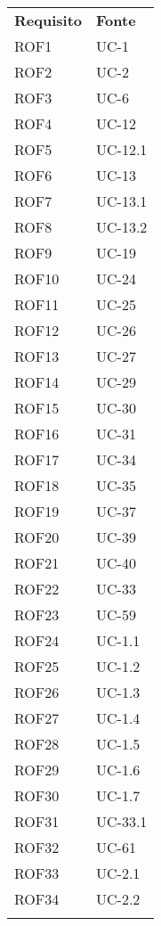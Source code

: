 \begin{longtable}{| p{5cm} | p{5cm} |}
		\rowcolor{LightBlue}
		\color{white}\bfseries Requisito & \color{white}\bfseries Fonte \\[0.25cm]
		\rowcolor{LightGray}
		ROF1 & UC-1\\
		ROF2 & UC-2\\
		\rowcolor{LightGray}
		ROF3 & UC-6\\
		ROF4 & UC-12\\
		\rowcolor{LightGray}
		ROF5 & UC-12.1\\
		ROF6 & UC-13\\
		\rowcolor{LightGray}
		ROF7 & UC-13.1\\
		ROF8 & UC-13.2\\
		\rowcolor{LightGray}
		ROF9 & UC-19\\
		ROF10 & UC-24\\
		\rowcolor{LightGray}
		ROF11 & UC-25\\
		ROF12 & UC-26\\
		\rowcolor{LightGray}
		ROF13 & UC-27\\
		ROF14 & UC-29\\
		\rowcolor{LightGray}
		ROF15 & UC-30\\
		ROF16 & UC-31\\
		\rowcolor{LightGray}
		ROF17 & UC-34\\
		ROF18 & UC-35\\
		\rowcolor{LightGray}
		ROF19 & UC-37\\
		ROF20 & UC-39\\
		\rowcolor{LightGray}
		ROF21 & UC-40\\
		ROF22 & UC-33\\
		\rowcolor{LightGray}
		ROF23 & UC-59\\
		ROF24 & UC-1.1\\
		\rowcolor{LightGray}
		ROF25 & UC-1.2\\
		ROF26 & UC-1.3\\
		\rowcolor{LightGray}
		ROF27 & UC-1.4\\
		ROF28 & UC-1.5\\
		\rowcolor{LightGray}
		ROF29 & UC-1.6\\
		ROF30 & UC-1.7\\
		\rowcolor{LightGray}
		ROF31 & UC-33.1\\
		ROF32 & UC-61\\
		\rowcolor{LightGray}
		ROF33 & UC-2.1\\
		ROF34 & UC-2.2\\
		\rowcolor{LightGray}

\end{longtable}
